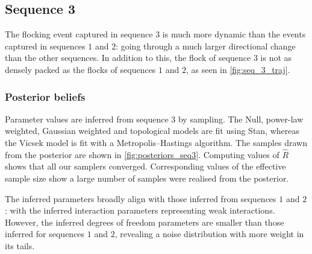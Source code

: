 \subsection{Sequence 3}

The flocking event captured in sequence $3$ is much more dynamic than the
events captured in sequences $1$ and $2$: going through a much larger
directional change than the other sequences. In addition to this, the flock of
sequence $3$ is not as densely packed as the flocks of sequences $1$ and $2$,
as seen in \cref{fig:seq_3_traj}.

\subsubsection{Posterior beliefs}

Parameter values are inferred from sequence $3$ by sampling. The Null,
power-law weighted, Gaussian weighted and topological models are fit using
Stan, whereas the Vicsek model is fit with a Metropolis--Hastings algorithm.
The samples drawn from the posterior are shown in \cref{fig:posteriors_seq3}.
Computing values of $\widehat{R}$ shows that all our samplers converged.
Corresponding values of the effective sample size show a large number of
samples were realised from the posterior.

The inferred parameters broadly align with those inferred from sequences $1$
and $2$: with the inferred interaction parameters representing weak
interactions. However, the inferred degrees of freedom parameters are smaller
than those inferred for sequences $1$ and $2$, revealing a noise distribution
with more weight in its tails.

